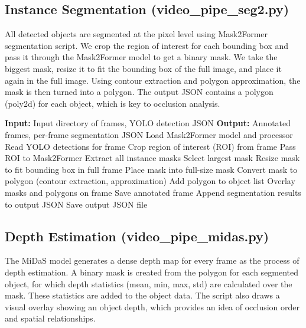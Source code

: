 \documentclass[12pt,a4paper]{report}
\theoremstyle{definition}
\theoremstyle{remark}
\begin{document}
\subsection{Instance Segmentation (video\_pipe\_seg2.py)}
All detected objects are segmented at the pixel level using Mask2Former segmentation script. We crop the region of interest for each bounding box and pass it through the Mask2Former model to get a binary mask. We take the biggest mask, resize it to fit the bounding box of the full image, and place it again in the full image. Using contour extraction and polygon approximation, the mask is then turned into a polygon. The output JSON contains a polygon (poly2d) for each object, which is key to occlusion analysis.

\begin{algorithm}[H]
\caption{Mask2Former Instance Segmentation Pipeline}
\label{alg:segmentation}
\begin{algorithmic}[1]
\State \textbf{Input:} Input directory of frames, YOLO detection JSON
\State \textbf{Output:} Annotated frames, per-frame segmentation JSON
\State Load Mask2Former model and processor
    \State Read YOLO detections for frame
        \State Crop region of interest (ROI) from frame
        \State Pass ROI to Mask2Former
        \State Extract all instance masks
        \State Select largest mask
        \State Resize mask to fit bounding box in full frame
        \State Place mask into full-size mask
        \State Convert mask to polygon (contour extraction, approximation)
        \State Add polygon to object list
    \EndFor
    \State Overlay masks and polygons on frame
    \State Save annotated frame
    \State Append segmentation results to output JSON
\EndFor
\State Save output JSON file
\end{algorithmic}
\end{algorithm}

\subsection{Depth Estimation (video\_pipe\_midas.py)} The MiDaS model generates a dense depth map for every frame as the process of depth estimation. A binary mask is created from the polygon for each segmented object, for which depth statistics (mean, min, max, std) are calculated over the mask. These statistics are added to the object data. The script also draws a visual overlay showing an object depth, which provides an idea of occlusion order and spatial relationships.
\end{document}
